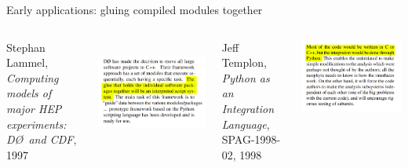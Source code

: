 \documentclass[aspectratio=169]{beamer}
\begin{document}
\begin{frame}{Early applications: gluing compiled modules together}
\vspace{0.5 cm}
\begin{columns}[t]
Stephan Lammel, {\it Computing models of major HEP experiments: D\O\ and CDF}, 1997

\vspace{0.25 cm}
\mbox{ } \hfill \includegraphics[width=0.87\linewidth]{PLOTS/early-python-d0.png} \hfill \mbox{ }

Jeff Templon, {\it Python as an Integration Language}, SPAG-1998-02, 1998

\vspace{0.25 cm}
\includegraphics[width=\linewidth]{PLOTS/early-python-halla.png}

\end{columns}
\end{frame}
\end{document}
